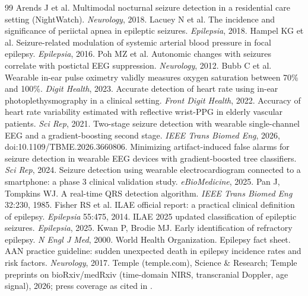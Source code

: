 \begin{thebibliography}{99}
 Arends J et al. Multimodal nocturnal seizure detection in a residential care setting (NightWatch). \emph{Neurology}, 2018.
 Lacuey N et al. The incidence and significance of periictal apnea in epileptic seizures. \emph{Epilepsia}, 2018.
 Hampel KG et al. Seizure-related modulation of systemic arterial blood pressure in focal epilepsy. \emph{Epilepsia}, 2016.
 Poh MZ et al. Autonomic changes with seizures correlate with postictal EEG suppression. \emph{Neurology}, 2012.
 Bubb C et al. Wearable in-ear pulse oximetry validly measures oxygen saturation between 70\% and 100\%. \emph{Digit Health}, 2023.
 Accurate detection of heart rate using in-ear photoplethysmography in a clinical setting. \emph{Front Digit Health}, 2022.
 Accuracy of heart rate variability estimated with reflective wrist-PPG in elderly vascular patients. \emph{Sci Rep}, 2021.
 Two-stage seizure detection with wearable single-channel EEG and a gradient-boosting second stage. \emph{IEEE Trans Biomed Eng}, 2026, doi:10.1109/TBME.2026.3660806.
 Minimizing artifact-induced false alarms for seizure detection in wearable EEG devices with gradient-boosted tree classifiers. \emph{Sci Rep}, 2024.
 Seizure detection using wearable electrocardiogram connected to a smartphone: a phase 3 clinical validation study. \emph{eBioMedicine}, 2025.
 Pan J, Tompkins WJ. A real-time QRS detection algorithm. \emph{IEEE Trans Biomed Eng} 32:230, 1985.
 Fisher RS et al. ILAE official report: a practical clinical definition of epilepsy. \emph{Epilepsia} 55:475, 2014.
 ILAE 2025 updated classification of epileptic seizures. \emph{Epilepsia}, 2025.
 Kwan P, Brodie MJ. Early identification of refractory epilepsy. \emph{N Engl J Med}, 2000.
 World Health Organization. Epilepsy fact sheet.
 AAN practice guideline: sudden unexpected death in epilepsy incidence rates and risk factors. \emph{Neurology}, 2017.
 Temple (temple.com), Science \& Research; Temple preprints on bioRxiv/medRxiv (time-domain NIRS, transcranial Doppler, age signal), 2026; press coverage as cited in .

\end{thebibliography}
